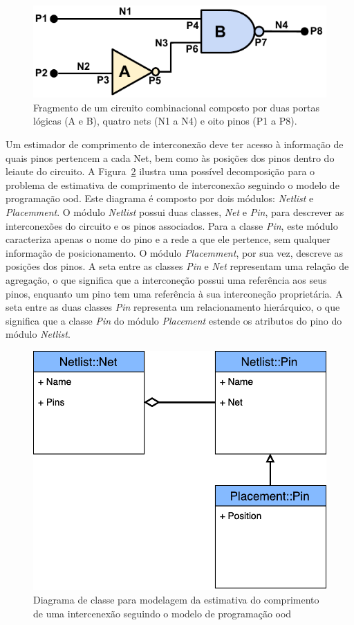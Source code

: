 \begin{figure}[ht]
    \centering
    \includegraphics[width=0.7\linewidth]{img/tecnica/circuitExample}
    \caption[Fragmento de um circuito combinacional]{Fragmento de um circuito combinacional composto por duas portas lógicas (A e B), quatro nets (N1 a N4) e oito pinos (P1 a P8).}
    \label{fig:circuito_exemplo}
\end{figure}

Um estimador de comprimento de interconexão deve ter acesso à informação de quais pinos pertencem a cada Net, bem como às posições dos pinos dentro do leiaute do circuito.
A Figura~\ref{fig:classHierarchyOOD} ilustra uma possível decomposição para o problema de estimativa de comprimento de interconexão seguindo o modelo de programação \ac{ood}.
Este diagrama é composto por dois módulos: \textit{Netlist} e \textit{Placemment}.
O módulo \textit{Netlist} possui duas classes, \textit{Net} e \textit{Pin}, para descrever as interconexões do circuito e os pinos associados.
Para a classe \textit{Pin}, este módulo caracteriza apenas o nome do pino e a rede a que ele pertence, sem qualquer informação de posicionamento.
O módulo \textit{Placemment}, por sua vez, descreve as posições dos pinos.
A seta entre as classes \textit{Pin} e \textit{Net} representam uma relação de agregação, o que significa que a interconeção possui uma referência aos seus pinos, enquanto um pino tem uma referência à sua interconeção proprietária.
A seta entre as duas classes \textit{Pin} representa um relacionamento hierárquico, o que significa que a classe \textit{Pin} do módulo \textit{Placement} estende os atributos do pino do módulo \textit{Netlist}.

\begin{figure}[ht]
    \centering
    \includegraphics[width=0.5\linewidth]{img/tecnica/classHierarchyOOD}
    \caption[Diagrama de classe com OOD]{Diagrama de classe para modelagem da estimativa do comprimento de uma intercenexão seguindo o modelo de programação \ac{ood}}
    \label{fig:classHierarchyOOD}
\end{figure}

